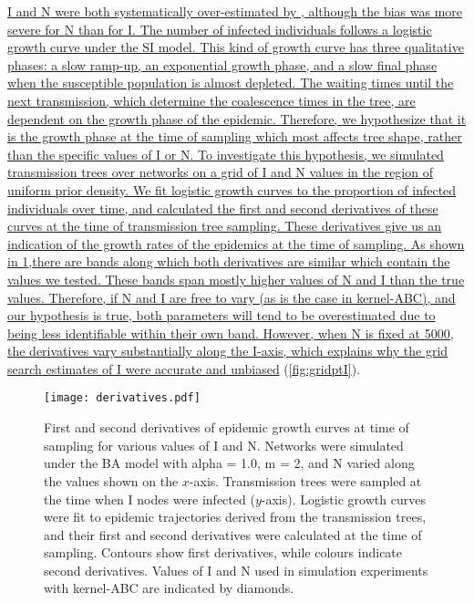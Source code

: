 \uline{
\gls{I} and \gls{N} were both systematically over-estimated by
, although the bias was more severe for \gls{N} than for
\gls{I}. The number of infected individuals follows a logistic growth curve
under the \gls{SI} model. This kind of growth curve has three qualitative
phases: a slow ramp-up, an exponential growth phase, and a slow final phase
when the susceptible population is almost depleted. The waiting times until the
next transmission, which determine the coalescence times in the tree, are
dependent on the growth phase of the epidemic. Therefore, we hypothesize that
it is the growth phase at the time of sampling which most affects tree shape,
rather than the specific values of \gls{I} or \gls{N}. To investigate this
hypothesis, we simulated transmission trees over networks on a grid of \gls{I}
and \gls{N} values in the region of uniform prior density. We fit logistic
growth curves to the proportion of infected individuals over time, and
calculated the first and second derivatives of these curves at the time of
transmission tree sampling. These derivatives give us an indication of the
growth rates of the epidemics at the time of sampling. As shown in
}\cref{fig:derivs},\uline{there are bands along which both derivatives are similar
which contain the values we tested. These bands span mostly higher values of
\gls{N} and \gls{I} than the true values. Therefore, if \gls{N} and \gls{I} are
free to vary (as is the case in kernel-\gls{ABC}), and our hypothesis is true,
both parameters will tend to be overestimated due to being less identifiable
within their own band. However, when \gls{N} is fixed at 5000, the derivatives
vary substantially along the \gls{I}-axis, which explains why the grid search
estimates of \gls{I} were accurate and unbiased} (\cref{fig:gridptI}).

\begin{figure}[ht]
  \centering
  \texttt{[image: derivatives.pdf]}
  \caption[
    First and second derivatives of epidemic growth curves at time of sampling
    for various values of $I$ and $N$.
  ]{
    First and second derivatives of epidemic growth curves at time of sampling
    for various values of \gls{I} and \gls{N}. Networks were simulated under
    the \gls{BA} model with \gls{alpha} = 1.0, \gls{m} = 2, and \gls{N} varied 
    along the values shown on the $x$-axis. Transmission trees were sampled at
    the time when \gls{I} nodes were infected ($y$-axis). Logistic growth
    curves were fit to epidemic trajectories derived from the transmission
    trees, and their first and second derivatives were calculated at the time
    of sampling. Contours show first derivatives, while colours indicate second
    derivatives. Values of \gls{I} and \gls{N} used in simulation experiments
    with kernel-\gls{ABC} are indicated by diamonds.
  }
  \label{fig:derivs}
\end{figure}

